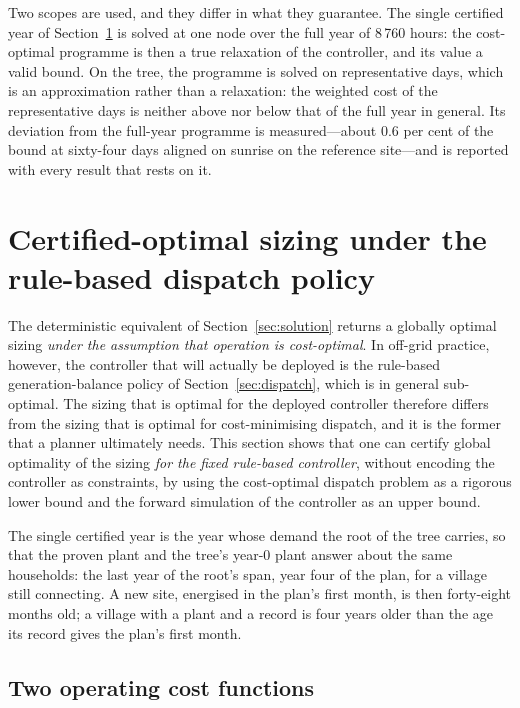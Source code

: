 \documentclass[11pt,a4paper]{article}
\theoremstyle{plain}
\theoremstyle{definition}
\begin{document}
Two scopes are used, and they differ in what they guarantee. The single certified year of
Section~\ref{sec:certify} is solved at one node over the full year of 8\,760 hours: the
cost-optimal programme is then a true relaxation of the controller, and its value a valid
bound. On the tree, the programme is solved on representative days, which is an
approximation rather than a relaxation: the weighted cost of the representative days is
neither above nor below that of the full year in general. Its deviation from the full-year
programme is measured---about 0.6 per cent of the bound at sixty-four days aligned on
sunrise on the reference site---and is reported with every result that rests on it.

\section{Certified-optimal sizing under the rule-based dispatch policy}
\label{sec:certify}

The deterministic equivalent of Section~\ref{sec:solution} returns a globally optimal
sizing \emph{under the assumption that operation is cost-optimal}. In off-grid practice,
however, the controller that will actually be deployed is the rule-based
generation-balance policy of Section~\ref{sec:dispatch}, which is in general
sub-optimal. The sizing that is optimal for the deployed controller therefore differs
from the sizing that is optimal for cost-minimising dispatch, and it is the former that a
planner ultimately needs. This section shows that one can certify global optimality of
the sizing \emph{for the fixed rule-based controller}, without encoding the controller as
constraints, by using the cost-optimal dispatch problem as a rigorous lower bound and the
forward simulation of the controller as an upper bound.

The single certified year is the year whose demand the root of the tree carries, so that the
proven plant and the tree's year-0 plant answer about the same households: the last year of
the root's span, year four of the plan, for a village still connecting. A new site,
energised in the plan's first month, is then forty-eight months old; a village with a plant
and a record is four years older than the age its record gives the plan's first month.

\subsection{Two operating cost functions}
\end{document}
